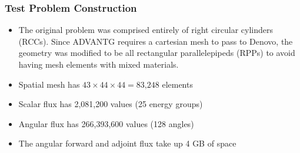 \documentclass[t]{beamer}
\begin{document}
\begin{frame}
  \frametitle{Test Problem Construction}
  \begin{itemize}
    \item The original problem was comprised entirely of right circular
          cylinders (RCCs). Since ADVANTG requires a cartesian mesh to pass to
          Denovo, the geometry was modified to be all rectangular
          parallelepipeds (RPPs) to avoid having mesh elements with mixed
          materials.
    \item Spatial mesh has $43 \times 44 \times 44 = \text{83,248}$ elements
    \item Scalar flux has 2,081,200 values (25 energy groups)
    \item Angular flux has 266,393,600 values (128 angles)
    \item The angular forward and adjoint flux take up 4 GB of space
  \end{itemize}
\end{frame}
\end{document}

